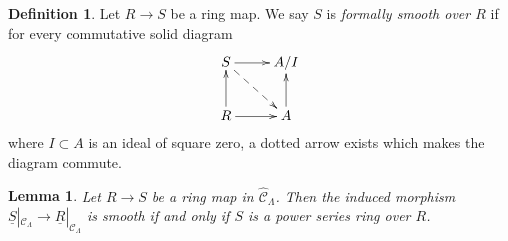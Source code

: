 \documentclass{amsart}
\theoremstyle{plain}
\newtheorem{lemma}[subsection]{Lemma}
\theoremstyle{definition}
\newtheorem{definition}[subsection]{Definition}
\theoremstyle{remark}
\numberwithin{equation}{subsection}
\begin{document}
\begin{definition}
\label{algebra-definition-formally-smooth}
Let $R \to S$ be a ring map.
We say $S$ is {\it formally smooth over $R$} if for every
commutative solid diagram
$$
\xymatrix{
S \ar[r] \ar@{-->}[rd] & A/I \\
R \ar[r] \ar[u] & A \ar[u]
}
$$
where $I \subset A$ is an ideal of square zero, a dotted
arrow exists which makes the diagram commute.
\end{definition}

\begin{lemma}
\label{lemma-smooth-morphism-power-series}
Let $R \to S$ be a ring map in $\widehat{\mathcal{C}}_\Lambda$. Then
the induced morphism
$\underline{S}|_{\mathcal{C}_\Lambda} \to \underline{R}|_{\mathcal{C}_\Lambda}$
is smooth if and only if $S$ is a power series ring over $R$.
\end{lemma}
\end{document}
